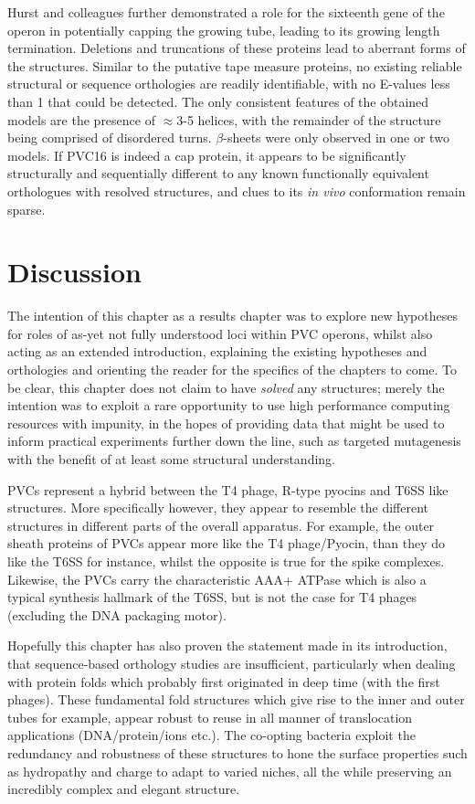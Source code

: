 Hurst and colleagues further demonstrated a role for the sixteenth gene of the operon in potentially capping the growing tube, leading to its growing length termination. Deletions and truncations of these proteins lead to aberrant forms of the structures. Similar to the putative tape measure proteins, no existing reliable structural or sequence orthologies are readily identifiable, with no E-values less than 1 that could be detected. The only consistent features of the obtained models are the presence of $\approx$3-5 helices, with the remainder of the structure being comprised of disordered turns. $\beta$-sheets were only observed in one or two models. If PVC16 is indeed a cap protein, it appears to be significantly structurally and sequentially different to any known functionally equivalent orthologues with resolved structures, and clues to its \emph{in vivo} conformation remain sparse.



\clearpage
\section{Discussion}
The intention of this chapter as a results chapter was to explore new hypotheses for roles of as-yet not fully understood loci within PVC operons, whilst also acting as an extended introduction, explaining the existing hypotheses and orthologies and orienting the reader for the specifics of the chapters to come. To be clear, this chapter does not claim to have \emph{solved} any structures; merely the intention was to exploit a rare opportunity to use high performance computing resources with impunity, in the hopes of providing data that might be used to inform practical experiments further down the line, such as targeted mutagenesis with the benefit of at least some structural understanding.

PVCs represent a hybrid between the T4 phage, R-type pyocins and T6SS like structures. More specifically however, they appear to resemble the different structures in different parts of the overall apparatus. For example, the outer sheath proteins of PVCs appear more like the T4 phage/Pyocin, than they do like the T6SS for instance, whilst the opposite is true for the spike complexes. Likewise, the PVCs carry the characteristic AAA+ ATPase which is also a typical synthesis hallmark of the T6SS, but is not the case for T4 phages (excluding the DNA packaging motor).

Hopefully this chapter has also proven the statement made in its introduction, that sequence-based orthology studies are insufficient, particularly when dealing with protein folds which probably first originated in deep time (with the first phages). These fundamental fold structures which give rise to the inner and outer tubes for example, appear robust to reuse in all manner of translocation applications (DNA/protein/ions etc.). The co-opting bacteria exploit the redundancy and robustness of these structures to hone the surface properties such as hydropathy and charge to adapt to varied niches, all the while preserving an incredibly complex and elegant structure.


